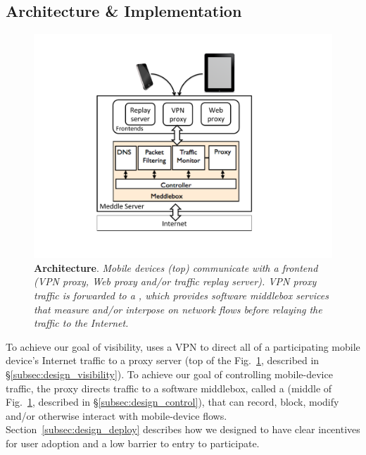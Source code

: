   

\subsection{Architecture \& Implementation}
\begin{figure}[tb]
\centering
\includegraphics[width=0.8\columnwidth]{figures/meddle-diagram.pdf}
\caption{\textbf{\meddle Architecture}. \emph{Mobile devices (top) communicate with 
a \meddle frontend (VPN proxy, Web proxy and/or 
traffic replay server). VPN proxy traffic is forwarded to a \meddlebox, which provides 
software middlebox services that measure and/or interpose on network flows before 
relaying the traffic to the Internet.}}
\vspace{\postfigspace}
\label{fig:architecture}
\end{figure}

To achieve our goal of visibility, \meddle uses a VPN to direct all of a participating 
mobile device's Internet traffic to a proxy server (top of the Fig.~\ref{fig:architecture}, 
described in \S\ref{subsec:design_visibility}). To achieve our goal of controlling mobile-device traffic, 
the \meddle proxy directs traffic to a software middlebox, called a \meddlebox (middle of Fig.~\ref{fig:architecture}, described in \S\ref{subsec:design_control}),
that can record, block, modify and/or otherwise interact with mobile-device flows. 
Section~\ref{subsec:design_deploy} describes how we designed \meddle to have clear 
incentives for user adoption and a low barrier to entry to participate.





